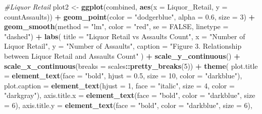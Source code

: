 \documentclass[
]{article}
\newenvironment{Shaded}{\begin{snugshade}}{\end{snugshade}}
\newcommand{\AttributeTok}[1]{\textcolor[rgb]{0.13,0.29,0.53}{#1}}
\newcommand{\CommentTok}[1]{\textcolor[rgb]{0.56,0.35,0.01}{\textit{#1}}}
\newcommand{\ConstantTok}[1]{\textcolor[rgb]{0.56,0.35,0.01}{#1}}
\newcommand{\DecValTok}[1]{\textcolor[rgb]{0.00,0.00,0.81}{#1}}
\newcommand{\FloatTok}[1]{\textcolor[rgb]{0.00,0.00,0.81}{#1}}
\newcommand{\FunctionTok}[1]{\textcolor[rgb]{0.13,0.29,0.53}{\textbf{#1}}}
\newcommand{\NormalTok}[1]{#1}
\newcommand{\OtherTok}[1]{\textcolor[rgb]{0.56,0.35,0.01}{#1}}
\newcommand{\SpecialCharTok}[1]{\textcolor[rgb]{0.81,0.36,0.00}{\textbf{#1}}}
\newcommand{\StringTok}[1]{\textcolor[rgb]{0.31,0.60,0.02}{#1}}
\begin{document}
\begin{Shaded}
\begin{Highlighting}[]
\CommentTok{\#Liquor Retail}
\NormalTok{plot2 }\OtherTok{\textless{}{-}} \FunctionTok{ggplot}\NormalTok{(combined, }\FunctionTok{aes}\NormalTok{(}\AttributeTok{x =} \StringTok{\textasciigrave{}}\AttributeTok{Liquor\_Retail}\StringTok{\textasciigrave{}}\NormalTok{, }\AttributeTok{y =} \StringTok{\textasciigrave{}}\AttributeTok{countAssaults}\StringTok{\textasciigrave{}}\NormalTok{)) }\SpecialCharTok{+} 
  \FunctionTok{geom\_point}\NormalTok{(}\AttributeTok{color =} \StringTok{"dodgerblue"}\NormalTok{, }\AttributeTok{alpha =} \FloatTok{0.6}\NormalTok{, }\AttributeTok{size =} \DecValTok{3}\NormalTok{) }\SpecialCharTok{+}
  \FunctionTok{geom\_smooth}\NormalTok{(}\AttributeTok{method =} \StringTok{"lm"}\NormalTok{, }\AttributeTok{color =} \StringTok{"red"}\NormalTok{, }\AttributeTok{se =} \ConstantTok{FALSE}\NormalTok{, }\AttributeTok{linetype =} \StringTok{"dashed"}\NormalTok{) }\SpecialCharTok{+}
  \FunctionTok{labs}\NormalTok{(}
    \AttributeTok{title =} \StringTok{"Liquor Retail vs Assaults Count"}\NormalTok{,  }
    \AttributeTok{x =} \StringTok{"Number of Liquor Retail"}\NormalTok{,}
    \AttributeTok{y =} \StringTok{"Number of Assaults"}\NormalTok{,}
    \AttributeTok{caption =} \StringTok{"Figure 3. Relationship between Liquor Retail and Assaults Count"}
\NormalTok{  ) }\SpecialCharTok{+} 
  \FunctionTok{scale\_y\_continuous}\NormalTok{() }\SpecialCharTok{+}
  \FunctionTok{scale\_x\_continuous}\NormalTok{(}\AttributeTok{breaks =}\NormalTok{ scales}\SpecialCharTok{::}\FunctionTok{pretty\_breaks}\NormalTok{(}\DecValTok{5}\NormalTok{)) }\SpecialCharTok{+}
  \FunctionTok{theme}\NormalTok{(}
    \AttributeTok{plot.title =} \FunctionTok{element\_text}\NormalTok{(}\AttributeTok{face =} \StringTok{"bold"}\NormalTok{, }\AttributeTok{hjust =} \FloatTok{0.5}\NormalTok{, }\AttributeTok{size =} \DecValTok{10}\NormalTok{, }\AttributeTok{color =} \StringTok{"darkblue"}\NormalTok{),}
    \AttributeTok{plot.caption =} \FunctionTok{element\_text}\NormalTok{(}\AttributeTok{hjust =} \DecValTok{1}\NormalTok{, }\AttributeTok{face =} \StringTok{"italic"}\NormalTok{, }\AttributeTok{size =} \DecValTok{4}\NormalTok{, }\AttributeTok{color =} \StringTok{"darkgray"}\NormalTok{),}
    \AttributeTok{axis.title.x =} \FunctionTok{element\_text}\NormalTok{(}\AttributeTok{face =} \StringTok{"bold"}\NormalTok{, }\AttributeTok{color =} \StringTok{"darkblue"}\NormalTok{, }\AttributeTok{size =} \DecValTok{6}\NormalTok{),}
    \AttributeTok{axis.title.y =} \FunctionTok{element\_text}\NormalTok{(}\AttributeTok{face =} \StringTok{"bold"}\NormalTok{, }\AttributeTok{color =} \StringTok{"darkblue"}\NormalTok{, }\AttributeTok{size =} \DecValTok{6}\NormalTok{),}

\end{Highlighting}
\end{Shaded}
\end{document}
